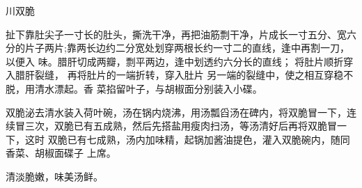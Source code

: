 \begin{recipe}{川双脆}

\ingredients


\cooking

\step 扯下靠肚尖子一寸长的肚头，撕洗干净，再把油筋剽干净，片成长一寸五分、宽六
分的片子两片;靠两长边约二分宽处划穿两根长约一寸二的直线，逢中再割一刀，以便入
味。腊肝切成两瓣，剽平两边，逢中划透约六分长的直线； 将肚片顺折穿入腊肝裂缝，
再将肚片的一端折转，穿入肚片 另一端的裂缝中，使之相互穿稳不脱，用清水漂起。香
菜掐留叶子，与胡椒面分别装入小碟。

\step 双脆泌去清水装入荷叶碗，汤在锅内烧沸，用汤瓢舀汤在碑内，将双脆冒一下，连
续冒三次，双脆已有五成熟，然后先搭盐用瘦肉扫汤，等汤清好后再将双脆冒一下，这时
双脆已有七成熟，汤内加味精，起锅加酱油提色，灌入双脆碗内，随同香菜、胡椒面碟子
上席。

\notes

清淡脆嫩，味美汤鲜。

\end{recipe}

